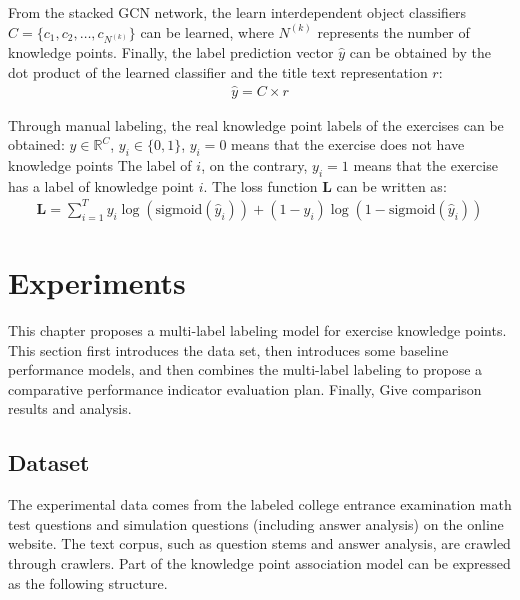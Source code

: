 From the stacked GCN network, the learn interdependent object classifiers \(C=\{c_1,c_2,\ldots,c_{N^{(k)}}\} \) can be learned, where \(N^{(k)}\) represents the number of knowledge points. Finally, the label prediction vector \(\hat{y}\) can be obtained by the dot product of the learned classifier and the title text representation \(r\):
\begin{align}
	\hat{y} = C\times r
\end{align}

Through manual labeling, the real knowledge point labels of the exercises can be obtained: \(y\in \mathbb{R}^C\), \(y_i\in \{0,1\} \), \(y_i=0\) means that the exercise does not have knowledge points The label of \(i\), on the contrary, \(y_i=1\) means that the exercise has a label of knowledge point \(i\). The loss function \(\mathbf{L}\) can be written as:
\begin{align}
	\mathbf{L}=\sum_{i=1}^{T} y_i \log (\text{sigmoid}(\hat{y}_i))+(1-y_i) \log (1-\text{sigmoid}(\hat{y}_i))
\end{align}

\section{Experiments}
This chapter proposes a multi-label labeling model for exercise knowledge points. This section first introduces the data set, then introduces some baseline performance models, and then combines the multi-label labeling to propose a comparative performance indicator evaluation plan. Finally, Give comparison results and analysis.
\subsection{Dataset}
The experimental data comes from the labeled college entrance examination math test questions and simulation questions (including answer analysis) on the online website. The text corpus, such as question stems and answer analysis, are crawled through crawlers. Part of the knowledge point association model can be expressed as the following structure.



